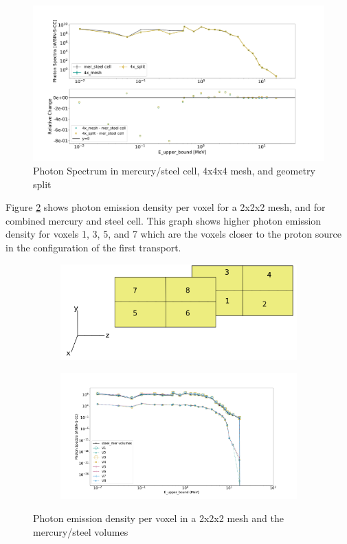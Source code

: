 \begin{figure}[H]
 \centering
 \includegraphics[scale=0.4,trim={2cm 0.5cm 3cm 2cm},clip]{../figs/toy_p2/spec_VPII_4x.pdf}
 \caption{Photon Spectrum in mercury/steel cell, 4x4x4 mesh, and geometry split}
 \label{fig:2spec_cell_4x}
\end{figure}
%
Figure \ref{fig:2spec_8v} shows photon emission density per voxel for a
2x2x2 mesh, and for combined mercury and steel cell. This graph shows higher
photon emission density for voxels 1, 3, 5, and 7 which are the voxels closer
to the proton source in the configuration of the first transport.
\begin{figure}[H]
        \begin{subfigure}[t]{1.0\textwidth}
                \hfill
                \includegraphics[scale=0.4, trim={0cm 0cm 0cm 0cm},clip]{../figs/voxels.png}
        \end{subfigure}\hfill
        \begin{subfigure}[t]{1.0\textwidth}
                \centering
                \includegraphics[scale=0.4, trim={2.5cm 1cm 3cm 3cm},clip]{../figs/toy_p2/spec_VPII_8.pdf}
        \end{subfigure}
        \caption{Photon emission density per voxel in a 2x2x2 mesh and the mercury/steel volumes}
        \label{fig:2spec_8v}
\end{figure}

